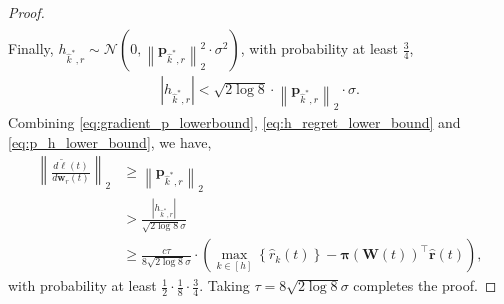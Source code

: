 \documentclass[10pt]{article}
\def\rvr{{\mathbf{r}}}
\def\rvw{{\mathbf{w}}}
\def\rvp{{\mathbf{p}}}
\def\rvpi{{\boldsymbol{\pi}}}
\def\rmW{{\mathbf{W}}}
\def\gN{{\mathcal{N}}}
\begin{document}
\begin{proof}
\begin{equation}
\begin{split}
\end{split}
\end{equation}
Finally, $h_{\hat{k}^*,r} \sim \gN\left( 0, \left\| \rvp_{\hat{k}^*, r} \right\|_2^2 \cdot \sigma^2 \right)$, with probability at least $\frac{3}{4}$,
\begin{equation}
\label{eq:p_h_lower_bound}
\begin{split}
	\left| h_{\hat{k}^*,r} \right| < \sqrt{2 \log{8}} \cdot \left\| \rvp_{\hat{k}^*, r} \right\|_2 \cdot \sigma.
\end{split}
\end{equation}
Combining \cref{eq:gradient_p_lowerbound}, \cref{eq:h_regret_lower_bound} and \cref{eq:p_h_lower_bound}, we have,
\begin{equation*}
\begin{split}
	\left\| \frac{d\tilde{\ell}\left(t\right)}{d \rvw_r(t)} \right\|_2 &\ge \left\| \rvp_{\hat{k}^*, r}\right\|_2 \\
	&> \frac{\left| h_{\hat{k}^*,r} \right|}{\sqrt{2 \log{8}} \sigma} \\
	&\ge \frac{c\tau}{8 \sqrt{2 \log{8}} \sigma} \cdot \left( \max\limits_{k \in \left[h\right]}\left\{ \hat{r}_k\left(t\right) \right\} - \rvpi\left( \rmW(t) \right)^\top \hat{\rvr}\left(t\right)  \right),
\end{split}
\end{equation*}
with probability at least $\frac{1}{2}  \cdot \frac{1}{8} \cdot \frac{3}{4} $. Taking $\tau = 8 \sqrt{2 \log{8}} \sigma$ completes the proof.
\end{proof}
\end{document}
